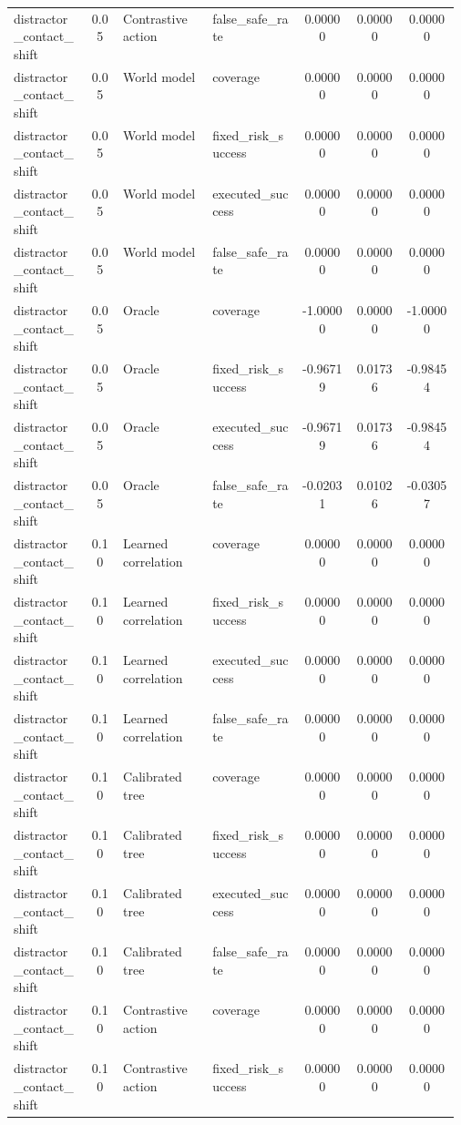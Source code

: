 \documentclass{article}
\begin{document}
\begin{center}
\begin{longtable}{p{0.17\linewidth}cp{0.20\linewidth}p{0.20\linewidth}ccc}
distractor\_contact\_shift & 0.05 & Contrastive action & false\_safe\_rate & 0.00000 & 0.00000 & 0.00000\\
distractor\_contact\_shift & 0.05 & World model & coverage & 0.00000 & 0.00000 & 0.00000\\
distractor\_contact\_shift & 0.05 & World model & fixed\_risk\_success & 0.00000 & 0.00000 & 0.00000\\
distractor\_contact\_shift & 0.05 & World model & executed\_success & 0.00000 & 0.00000 & 0.00000\\
distractor\_contact\_shift & 0.05 & World model & false\_safe\_rate & 0.00000 & 0.00000 & 0.00000\\
distractor\_contact\_shift & 0.05 & Oracle & coverage & -1.00000 & 0.00000 & -1.00000\\
distractor\_contact\_shift & 0.05 & Oracle & fixed\_risk\_success & -0.96719 & 0.01736 & -0.98454\\
distractor\_contact\_shift & 0.05 & Oracle & executed\_success & -0.96719 & 0.01736 & -0.98454\\
distractor\_contact\_shift & 0.05 & Oracle & false\_safe\_rate & -0.02031 & 0.01026 & -0.03057\\
distractor\_contact\_shift & 0.10 & Learned correlation & coverage & 0.00000 & 0.00000 & 0.00000\\
distractor\_contact\_shift & 0.10 & Learned correlation & fixed\_risk\_success & 0.00000 & 0.00000 & 0.00000\\
distractor\_contact\_shift & 0.10 & Learned correlation & executed\_success & 0.00000 & 0.00000 & 0.00000\\
distractor\_contact\_shift & 0.10 & Learned correlation & false\_safe\_rate & 0.00000 & 0.00000 & 0.00000\\
distractor\_contact\_shift & 0.10 & Calibrated tree & coverage & 0.00000 & 0.00000 & 0.00000\\
distractor\_contact\_shift & 0.10 & Calibrated tree & fixed\_risk\_success & 0.00000 & 0.00000 & 0.00000\\
distractor\_contact\_shift & 0.10 & Calibrated tree & executed\_success & 0.00000 & 0.00000 & 0.00000\\
distractor\_contact\_shift & 0.10 & Calibrated tree & false\_safe\_rate & 0.00000 & 0.00000 & 0.00000\\
distractor\_contact\_shift & 0.10 & Contrastive action & coverage & 0.00000 & 0.00000 & 0.00000\\
distractor\_contact\_shift & 0.10 & Contrastive action & fixed\_risk\_success & 0.00000 & 0.00000 & 0.00000\\

\end{longtable}
\end{center}
\end{document}
